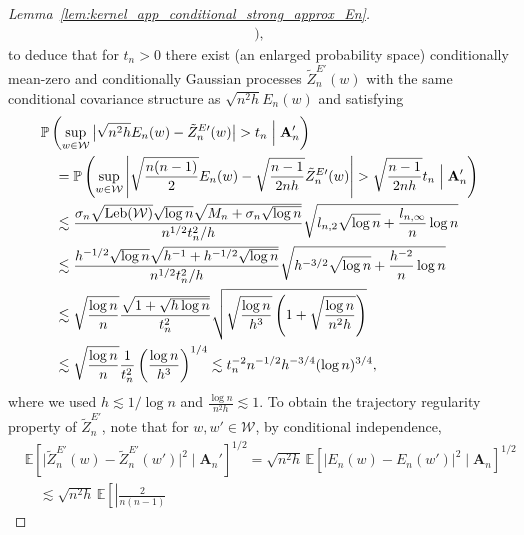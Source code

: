 \documentclass[11pt,lof]{puthesis}
\renewcommand{\P}{\ensuremath{\mathbb{P}}}
\newcommand{\E}{\ensuremath{\mathbb{E}}}
\newcommand{\bA}{\ensuremath{\mathbf{A}}}
\newcommand{\cW}{\ensuremath{\mathcal{W}}}
\DeclareMathOperator{\Leb}{Leb}
\theoremstyle{break}
\theoremstyle{proof}
\newtheorem{proof}{Proof}
\begin{document}
\begin{proof}[Lemma~\ref{lem:kernel_app_conditional_strong_approx_En}]
\begin{align*}
    \Big),
  \end{align*}
  to deduce that for $t_n > 0$ there exist
  (an enlarged probability space)
  conditionally mean-zero
  and conditionally Gaussian processes
  $\tilde Z_n^{E\prime}(w)$
  with the same conditional covariance structure as
  $\sqrt{n^2 h} E_n(w)$ and
  satisfying
  \begin{align*}
    &\P\left(
      \sup_{w \in \cW}
      \big|
      \sqrt{n^2h} E_n(w) - \tilde Z_n^{E\prime}(w)
      \big|
      > t_n
      \Bigm\vert \bA_n'
    \right) \\
    &\quad=
    \P\left(
      \sup_{w \in \cW}
      \left|
      \sqrt{\frac{n(n-1)}{2}} E_n(w)
      - \sqrt{\frac{n-1}{2 n h}} \tilde Z_n^{E\prime}(w)
      \right|
      > \sqrt{\frac{n-1}{2 n h}}
      t_n
      \Bigm\vert \bA_n'
    \right) \\
    &\quad\lesssim
    \frac{
      \sigma_n
      \sqrt{\Leb(\cW)}
      \sqrt{\log n}
      \sqrt{M_n + \sigma_n\sqrt{\log n}}
    }{n^{1/2} t_n^2 / h}
    \sqrt{
      l_{n,2}
      \sqrt{\log n}
      + \frac{l_{n,\infty}}{n}
    \log n} \\
    &\quad\lesssim
    \frac{
      h^{-1/2}
      \sqrt{\log n}
      \sqrt{h^{-1} + h^{-1/2} \sqrt{\log n}}
    }{n^{1/2} t_n^2 / h}
    \sqrt{
      h^{-3/2}
      \sqrt{\log n}
      + \frac{h^{-2}}{n}
    \log n} \\
    &\quad\lesssim
    \sqrt{\frac{\log n}{n}}
    \frac{
      \sqrt{1 + \sqrt{h \log n}}
    }{t_n^2}
    \sqrt{
      \sqrt{\frac{\log n}{h^3}}
      \left( 1 + \sqrt{\frac{\log n}{n^2 h}} \right)
    } \\
    &\quad\lesssim
    \sqrt{\frac{\log n}{n}}
    \frac{ 1 }{t_n^2}
    \left(
      \frac{\log n}{h^3}
    \right)^{1/4}
    \lesssim
    t_n^{-2}
    n^{-1/2}
    h^{-3/4}
    (\log n)^{3/4},
  \end{align*}
  where we used
  $h \lesssim 1 / \log n$
  and $\frac{\log n}{n^2 h} \lesssim 1$.
  To obtain the trajectory regularity property of
  $\tilde Z_n^{E\prime}$,
  note that
  for $w, w' \in \cW$,
  by conditional independence,
  \begin{align*}
    &\E\left[
      \big|
      \tilde Z_n^{E\prime}(w)
      - \tilde Z_n^{E\prime}(w')
      \big|^2
      \mid \bA_n'
    \right]^{1/2}
    =
    \sqrt{n^2h} \,
    \E\left[
      \big|
      E_n(w)
      - E_n(w')
      \big|^2
      \mid \bA_n
    \right]^{1/2} \\
    &\quad\lesssim
    \sqrt{n^2h} \,
    \E\left[
      \left|
      \frac{2}{n(n-1)}

\end{align*}
\end{proof}
\end{document}
